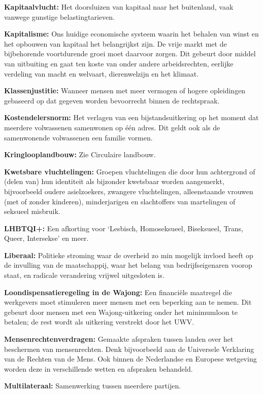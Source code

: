 \textbf{Kapitaalvlucht:} Het doorsluizen van kapitaal naar het
buitenland, vaak vanwege gunstige belastingtarieven.

\textbf{Kapitalisme:} Ons huidige economische systeem waarin het behalen
van winst en het opbouwen van kapitaal het belangrijkst zijn. De vrije
markt met de bijbehorende voortdurende groei moet daarvoor zorgen. Dit
gebeurt door middel van uitbuiting en gaat ten koste van onder andere
arbeidsrechten, eerlijke verdeling van macht en welvaart, dierenwelzijn
en het klimaat.

\textbf{Klassenjustitie:} Wanneer mensen met meer vermogen of hogere
opleidingen gebaseerd op dat gegeven worden bevoorrecht binnen de
rechtspraak.

\textbf{Kostendelersnorm:} Het verlagen van een bijstandsuitkering op
het moment dat meerdere volwassenen samenwonen op één adres. Dit geldt
ook als de samenwonende volwassenen een familie vormen.

\textbf{Kringlooplandbouw:} Zie Circulaire landbouw.

\textbf{Kwetsbare vluchtelingen:} Groepen vluchtelingen die door hun
achtergrond of (delen van) hun identiteit als bijzonder kwetsbaar worden
aangemerkt, bijvoorbeeld oudere asielzoekers, zwangere vluchtelingen,
alleenstaande vrouwen (met of zonder kinderen), minderjarigen en
slachtoffers van martelingen of seksueel misbruik.

\textbf{LHBTQI+:} Een afkorting voor `Lesbisch, Homoseksueel,
Biseksueel, Trans, Queer, Intersekse' en meer.

\textbf{Liberaal:} Politieke stroming waar de overheid zo min mogelijk
invloed heeft op de invulling van de maatschappij, waar het belang van
bedrijfseigenaren voorop staat, en radicale verandering vrijwel
uitgesloten is.

\textbf{Loondispensatieregeling in de Wajong:} Een financiële maatregel
die werkgevers moet stimuleren meer mensen met een beperking aan te
nemen. Dit gebeurt door mensen met een Wajong-uitkering onder het
minimumloon te betalen; de rest wordt als uitkering verstrekt door het
UWV.

\textbf{Mensenrechtenverdragen:} Gemaakte afspraken tussen landen over
het beschermen van mensenrechten. Denk bijvoorbeeld aan de Universele
Verklaring van de Rechten van de Mens. Ook binnen de Nederlandse en
Europese wetgeving worden deze in verschillende wetten en afspraken
behandeld.

\textbf{Multilateraal:} Samenwerking tussen meerdere partijen.

